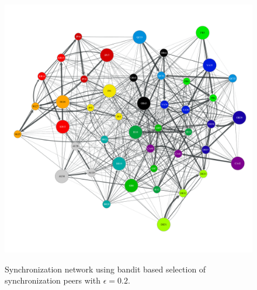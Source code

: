 \begin{figure}
    \begin{center}
        \includegraphics[width=5in]{figures/ch06_b-epsilon-greedy-0-2-e3.pdf}
    \end{center}
    \renewcommand{\baselinestretch}{1}
    \small\normalsize

    \begin{quote}
        \caption[Greedy Epsilon Anti-Entropy Synchronization Network]{Synchronization network using bandit based selection of synchronization peers with $\epsilon=0.2$.}
        \label{fig:ch06_epsilon_greedy_topology}
    \end{quote}
\end{figure}
\renewcommand{\baselinestretch}{2}
\small\normalsize

